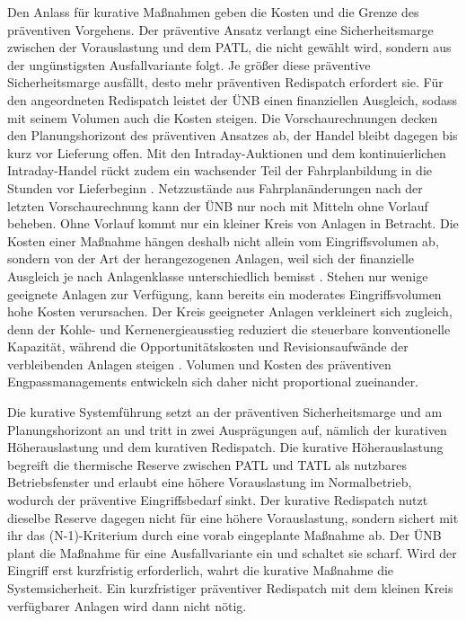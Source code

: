 Den Anlass für kurative Maßnahmen geben die Kosten und die Grenze des präventiven Vorgehens.
Der präventive Ansatz verlangt eine Sicherheitsmarge zwischen der Vorauslastung und dem \ac{PATL}, die nicht gewählt wird, sondern aus der ungünstigsten Ausfallvariante folgt.
Je größer diese präventive Sicherheitsmarge ausfällt, desto mehr präventiven Redispatch erfordert sie.
Für den angeordneten Redispatch leistet der \ac{ÜNB} einen finanziellen Ausgleich, sodass mit seinem Volumen auch die Kosten steigen.
Die Vorschaurechnungen decken den Planungshorizont des präventiven Ansatzes ab, der Handel bleibt dagegen bis kurz vor Lieferung offen.
Mit den Intraday-Auktionen und dem kontinuierlichen Intraday-Handel rückt zudem ein wachsender Teil der Fahrplanbildung in die Stunden vor Lieferbeginn \cite{mahgoub_wie_2025}.
Netzzustände aus Fahrplanänderungen nach der letzten Vorschaurechnung kann der \ac{ÜNB} nur noch mit Mitteln ohne Vorlauf beheben.
Ohne Vorlauf kommt nur ein kleiner Kreis von Anlagen in Betracht.
Die Kosten einer Maßnahme hängen deshalb nicht allein vom Eingriffsvolumen ab, sondern von der Art der herangezogenen Anlagen, weil sich der finanzielle Ausgleich je nach Anlagenklasse unterschiedlich bemisst \cite{bundesministerium_der_justiz_energiewirtschaftsgesetz_2025, bundesnetzagentur_festlegung_2024}.
Stehen nur wenige geeignete Anlagen zur Verfügung, kann bereits ein moderates Eingriffsvolumen hohe Kosten verursachen.
Der Kreis geeigneter Anlagen verkleinert sich zugleich, denn der Kohle- und Kernenergieausstieg reduziert die steuerbare konventionelle Kapazität, während die Opportunitätskosten und Revisionsaufwände der verbleibenden Anlagen steigen \cite{innosys_2030_gesamtverbund_innovationen_2021}.
Volumen und Kosten des präventiven Engpassmanagements entwickeln sich daher nicht proportional zueinander.

Die kurative Systemführung setzt an der präventiven Sicherheitsmarge und am Planungshorizont an und tritt in zwei Ausprägungen auf, nämlich der kurativen Höherauslastung und dem kurativen Redispatch.
Die kurative Höherauslastung begreift die thermische Reserve zwischen \ac{PATL} und \ac{TATL} als nutzbares Betriebsfenster und erlaubt eine höhere Vorauslastung im Normalbetrieb, wodurch der präventive Eingriffsbedarf sinkt.
Der kurative Redispatch nutzt dieselbe Reserve dagegen nicht für eine höhere Vorauslastung, sondern sichert mit ihr das \mbox{(N-1)-Kriterium} durch eine vorab eingeplante Maßnahme ab.
Der \ac{ÜNB} plant die Maßnahme für eine Ausfallvariante ein und schaltet sie scharf.
Wird der Eingriff erst kurzfristig erforderlich, wahrt die kurative Maßnahme die Systemsicherheit.
Ein kurzfristiger präventiver Redispatch mit dem kleinen Kreis verfügbarer Anlagen wird dann nicht nötig.


